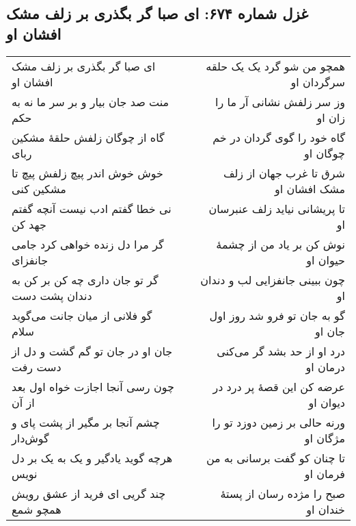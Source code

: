 \begin{center}
\section*{غزل شماره ۶۷۴: ای صبا گر بگذری بر زلف مشک افشان او}
\label{sec:674}
\begin{longtable}{l p{0.5cm} r}
ای صبا گر بگذری بر زلف مشک افشان او
&&
همچو من شو گرد یک یک حلقه سرگردان او
\\
منت صد جان بیار و بر سر ما نه به حکم
&&
وز سر زلفش نشانی آر ما را زان او
\\
گاه از چوگان زلفش حلقهٔ مشکین ربای
&&
گاه خود را گوی گردان در خم چوگان او
\\
خوش خوش اندر پیچ زلفش پیچ تا مشکین کنی
&&
شرق تا غرب جهان از زلف مشک افشان او
\\
نی خطا گفتم ادب نیست آنچه گفتم جهد کن
&&
تا پریشانی نیاید زلف عنبرسان او
\\
گر مرا دل زنده خواهی کرد جامی جانفزای
&&
نوش کن بر یاد من از چشمهٔ حیوان او
\\
گر تو جان داری چه کن بر کن به دندان پشت دست
&&
چون ببینی جانفزایی لب و دندان او
\\
گو فلانی از میان جانت می‌گوید سلام
&&
گو به جان تو فرو شد روز اول جان او
\\
جان او در جان تو گم گشت و دل از دست رفت
&&
درد او از حد بشد گر می‌کنی درمان او
\\
چون رسی آنجا اجازت خواه اول بعد از آن
&&
عرضه کن این قصهٔ پر درد در دیوان او
\\
چشم آنجا بر مگیر از پشت پای و گوش‌دار
&&
ورنه حالی بر زمین دوزد تو را مژگان او
\\
هرچه گوید یادگیر و یک به یک بر دل نویس
&&
تا چنان کو گفت برسانی به من فرمان او
\\
چند گریی ای فرید از عشق رویش همچو شمع
&&
صبح را مژده رسان از پستهٔ خندان او
\\
\end{longtable}
\end{center}
